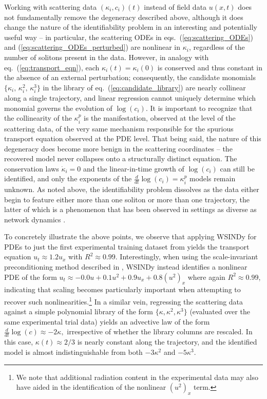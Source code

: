 \documentclass[journal=gmj]{CUP-JNL-DTM}%
\theoremstyle{definition}
\numberwithin{equation}{section}
\begin{document}
Working with scattering data $(\kappa_i, c_i)(t)$ instead of field data $u(x,t)$ does not fundamentally remove the degeneracy described above, although it does change the nature of the identifiability problem in an interesting and potentially useful way -- in particular, the scattering ODEs in eqs.~(\ref{eq:scattering_ODEs}) and (\ref{eq:scattering_ODEs_perturbed}) are nonlinear in $\kappa_i$, regardless of the number of solitons present in the data. However, in analogy with eq.~(\ref{eq:transport_eqn}), each $\kappa_i(t) = \kappa_i(0)$ is conserved and thus constant in the absence of an external perturbation; consequently, the candidate monomials $\{\kappa_i,\,\kappa^2_i,\,\kappa^3_i\}$ in the library of eq.~(\ref{eq:candidate_library}) are nearly collinear along a single trajectory, and linear regression cannot uniquely determine which monomial governs the evolution of $\log(c_i)$. It is important to recognize that the collinearity of the $\kappa^p_i$ is the manifestation, observed at the level of the scattering data, of the very same mechanism responsible for the spurious transport equation observed at the PDE level. That being said, the nature of this degeneracy does become more benign in the scattering coordinates -- the recovered model never collapses onto a structurally distinct equation. The conservation laws $\dot{\kappa}_i = 0$ and the linear-in-time growth of $\log(c_i)$ can still be identified, and only the exponents of the $\tfrac{d}{dt}\log(c_i) = \kappa^p_i$ models remain unknown. As noted above, the identifiability problem dissolves as the data either begin to feature either more than one soliton or more than one trajectory, the latter of which is a phenomenon that has been observed in settings as diverse as network dynamics \cite{Tian.etal2026}.

\smallskip

To concretely illustrate the above points, we observe that applying WSINDy for PDEs \cite{Messenger.Bortz2021JournalofComputationalPhysics} to just the first experimental training dataset from \cite{Heinrich.etal2026} yields the transport equation $u_t \approx 1.2u_x$ with $R^2 \approx 0.99$. Interestingly, when using the scale-invariant preconditioning method described in \cite{Messenger.etal2024SciRep}, WSINDy instead identifies a nonlinear PDE of the form $u_{t} \approx - 0.0u + 0.1u^2 + 0.9u_{x} + 0.8(u^2)_{x}$ where again $R^2 \approx 0.99$, indicating that scaling becomes particularly important when attempting to recover such nonlinearities.\footnote{We note that additional radiation content in the experimental data may also have aided in the identification of the nonlinear $(u^2)_x$ term.} In a similar vein, regressing the scattering data against a simple polynomial library of the form $\{\kappa,\kappa^2,\kappa^3\}$ (evaluated over the same experimental trial data) yields an advective law of the form $\tfrac{d}{dt}\log(c) \approx -2\kappa,$ irrespective of whether the library columns are rescaled. In this case, $\kappa(t) \approx 2/3$ is nearly constant along the trajectory, and the identified model is almost indistinguishable from both $-3\kappa^2$ and $-5\kappa^3$.
\end{document}
